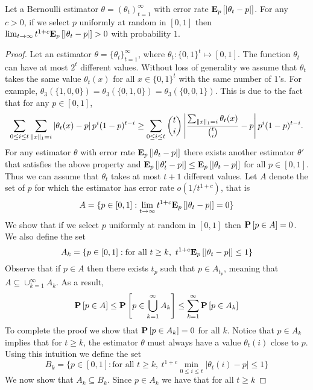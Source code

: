 \begin{lemma}\label{l:estimation_lower_bound}
  Let a Bernoulli estimator $\theta=(\theta_t)_{t=1}^\infty$
  with error rate $\Expnew{p}{|\theta_t  - p |}$.
  For any $c>0$, if we select $p$ uniformly at random in $[0,1]$ then
   \(\lim_{t\to \infty} t^{1+c} \Expnew{p}{|\theta_t  - p |} > 0\) with
   probability $1$.
\end{lemma}
\begin{proof}
  Let an estimator $\theta = \{\theta_t\}_{t=1}^{\infty}$, where
  $\theta_t: \{0,1\}^t\mapsto [0,1]$.  The function $\theta_t$ can have at most
  $2^t$ different values. Without loss of generality we assume that
  $\theta_t$ takes the same value $\theta_t(x)$ for all $x \in \{0,1\}^t$
  with the same number of $1$'s. For example,
  $\theta_3(\{1,0,0\})=\theta_3(\{0,1,0\})=\theta_3(\{0,0,1\})$.
  This is due to the fact that for any $p \in[0,1]$,
  \[
    \sum_{0 \leq i \leq t} \sum_{\norm{1}{x} = i} \lp| \theta_t(x) - p \rp|
    p^i (1-p)^{t-i} \geq \sum_{0 \leq i \leq t} \binom{t}{i} \lp|
    \frac{\sum_{\norm{1}{x} = i} \theta_t(x)}{\binom{t}{i}}  - p \rp| p^i
    (1-p)^{t-i}.
  \]
  For any estimator $\theta$ with error rate $\Expnew{p}{|\theta_t  - p |}$ there exists another
  estimator $\theta'$ that satisfies the above property and
  $\Expnew{p}{|\theta_t'  - p |} \leq \Expnew{p}{|\theta_t  - p |}$ for all $p \in [0,1]$.
  Thus we can assume that $\theta_t$ takes at most $t+1$ different
  values.
  Let $A$ denote the set of $p$ for which the estimator has error
  rate $o(1/t^{1+c})$, that is
  \[
    A= \{p\in [0,1]: \lim_{t \to \infty} t^{1+c}\Expnew{p}{|\theta_t  - p |}=0\}
  \]
  We show that if we select $p$ uniformly at random in $[0,1]$ then
  $\Prob{p \in A} = 0$.  We also define the set
  \[
    A_k=\{p\in [0,1]: \text{for all }t \geq k,~ t^{1+c}\Expnew{p}{|\theta_t  - p |}\leq 1\}
  \]
  Observe that if $p \in A$ then there exists $t_p$ such that
  $p \in A_{t_p}$, meaning that
  $A \subseteq \cup_{k=1}^{\infty}A_k$.  As a result,
  \[
    \Prob{p \in A} \leq \Prob {p \in\bigcup_{k=1}^{\infty}A_k} \leq
    \sum_{k=1}^{\infty}\Prob{p \in A_k}
  \]
  To complete the proof we show that $\Prob{p \in A_k}=0$ for all $k$.
  Notice that $p \in A_k$ implies that for $t \geq k$, the estimator
  $\theta$ must always have a value $\theta_t(i)$ close to $p$.
  Using this intuition we define the set
  \[
    B_k = \{p \in [0,1]: \text{for all
    }t\geq k,~ t^{1+c}\min_{0\leq i \leq t}|\theta_t(i)-p| \leq 1\}
  \]
  We now show that $A_k \subseteq B_k$.
  Since $p \in A_k$ we have that for all $t\geq k$

\end{proof}
